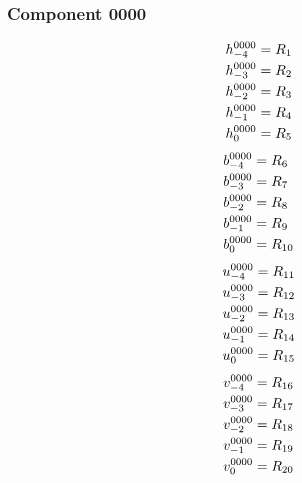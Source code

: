 \documentclass[11pt,a4paper]{article}
\begin{document}
\subsubsection{Component 0000}
\begin{equation}
\shortstack[l]{$\displaystyle h^{0000}_{-4}=R_{1}$\\
$\displaystyle h^{0000}_{-3}=R_{2}$\\
$\displaystyle h^{0000}_{-2}=R_{3}$\\
$\displaystyle h^{0000}_{-1}=R_{4}$\\
$\displaystyle h^{0000}_{0}=R_{5}$}
\label{eq:cat-map-2}
\end{equation}
\begin{equation}
\shortstack[l]{$\displaystyle b^{0000}_{-4}=R_{6}$\\
$\displaystyle b^{0000}_{-3}=R_{7}$\\
$\displaystyle b^{0000}_{-2}=R_{8}$\\
$\displaystyle b^{0000}_{-1}=R_{9}$\\
$\displaystyle b^{0000}_{0}=R_{10}$}
\label{eq:cat-map-3}
\end{equation}
\begin{equation}
\shortstack[l]{$\displaystyle u^{0000}_{-4}=R_{11}$\\
$\displaystyle u^{0000}_{-3}=R_{12}$\\
$\displaystyle u^{0000}_{-2}=R_{13}$\\
$\displaystyle u^{0000}_{-1}=R_{14}$\\
$\displaystyle u^{0000}_{0}=R_{15}$}
\label{eq:cat-map-4}
\end{equation}
\begin{equation}
\shortstack[l]{$\displaystyle v^{0000}_{-4}=R_{16}$\\
$\displaystyle v^{0000}_{-3}=R_{17}$\\
$\displaystyle v^{0000}_{-2}=R_{18}$\\
$\displaystyle v^{0000}_{-1}=R_{19}$\\
$\displaystyle v^{0000}_{0}=R_{20}$}
\label{eq:cat-map-5}
\end{equation}
\end{document}
